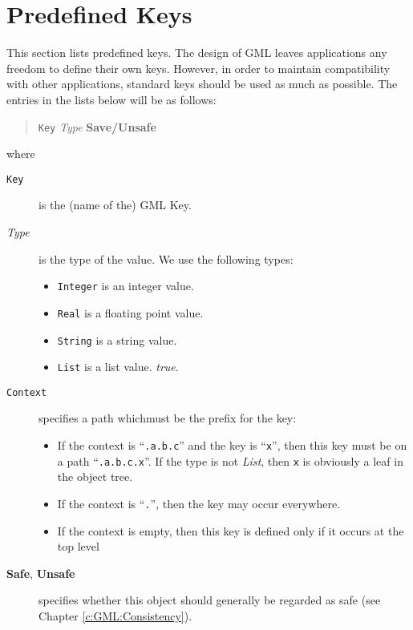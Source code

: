 %
%

\chapter{Predefined Keys}

This section lists predefined keys. The design of GML leaves
applications any freedom to define their own keys. However, in
order to maintain compatibility with other applications, standard
keys should be used as much as possible.  The entries in the
lists below will be as follows:

\begin{quote}
  \texttt{Key}
  \emph{Type}
  \hfill
  \qquad\textbf{Save/Unsafe}
\end{quote}

\noindent where

\begin{description}

  \item[\texttt{Key}] is the (name of the) GML Key.

  \item[\emph{Type}] is the type of the value.
  We use the following types:
  \begin{itemize}
    \item \texttt{Integer} is an integer value.
    \item \texttt{Real} is a floating point value.
    \item \texttt{String} is a string value.
    \item \texttt{List} is a list value.
    \emph{true}.
  \end{itemize}
  
  \item[\texttt{Context}] specifies a path whichmust be the
  prefix for the key:
  \begin{itemize}
    \item If the context is ``\texttt{.a.b.c}'' and the key is
    ``\texttt{x}'', then this key must be on a path
    ``\texttt{.a.b.c.x}''.
    If the type is not \emph{List}, then \texttt{x} is obviously
    a leaf in the object tree.
    \item If the context is ``\texttt{.}'', then the key may
    occur everywhere.
    \item If the context is empty, then this key is defined only
    if it occurs at the top level
  \end{itemize}
  
  
  \item[\textbf{Safe}, \textbf{Unsafe}] specifies whether this
  object should generally be regarded as safe (see Chapter
  \ref{c:GML:Consistency}).

\end{description}


